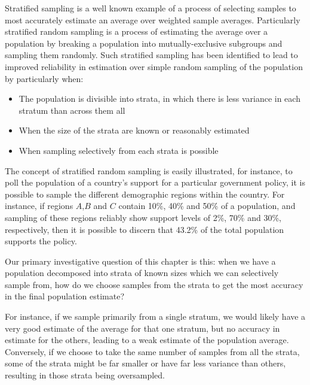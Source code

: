 
Stratified sampling is a well known example of a process of selecting samples to most accurately estimate an average over weighted sample averages.
Particularly stratified random sampling is a process of estimating the average over a population by breaking a population into mutually-exclusive subgroups and sampling them randomly.
Such stratified sampling has been identified to lead to improved reliability in estimation over simple random sampling of the population by \cite{1938.10503378,10.2307/23339498} particularly when:
\begin{itemize}
\item The population is divisible into strata, in which there is less variance in each stratum than across them all 
\item When the size of the strata are known or reasonably estimated
\item When sampling selectively from each strata is possible 
\end{itemize}

The concept of stratified random sampling is easily illustrated, for instance, to poll the population of a country's support for a particular government policy, it is possible to sample the different demographic regions within the country.
For instance, if regions $A$,$B$ and $C$ contain 10\%, 40\% and 50\% of a population, and sampling of these regions reliably show support levels of 2\%, 70\% and 30\%, respectively, then it is possible to discern that 43.2\% of the total population supports the policy.

Our primary investigative question of this chapter is this: when we have a population decomposed into strata of known sizes which we can selectively sample from, how do we choose samples from the strata to get the most accuracy in the final population estimate?

For instance, if we sample primarily from a single stratum, we would likely have a very good estimate of the average for that one stratum, but no accuracy in estimate for the others, leading to a weak estimate of the population average.
Conversely, if we choose to take the same number of samples from all the strata, some of the strata might be far smaller or have far less variance than others, resulting in those strata being oversampled.


